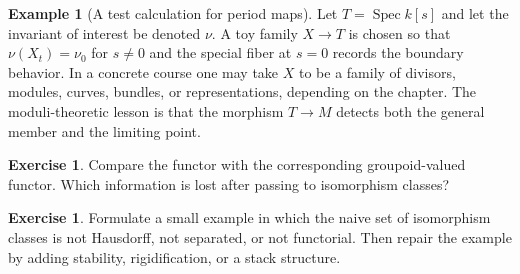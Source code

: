 \documentclass[11pt]{amsart}
\theoremstyle{definition}
\newtheorem{example}[theorem]{Example}
\newtheorem{exercise}[theorem]{Exercise}
\newcommand{\Spec}{\operatorname{Spec}}
\begin{document}
\begin{example}[A test calculation for period maps]
Let $T=\Spec k[s]$ and let the invariant of interest be denoted $\nu$.  A toy family $X\to T$ is chosen so that $\nu(X_t)=\nu_0$ for $s\ne0$ and the special fiber at $s=0$ records the boundary behavior.  In a concrete course one may take $X$ to be a family of divisors, modules, curves, bundles, or representations, depending on the chapter.  The moduli-theoretic lesson is that the morphism $T\to M$ detects both the general member and the limiting point.
\end{example}
\begin{exercise}
Compare the functor with the corresponding groupoid-valued functor.  Which information is lost after passing to isomorphism classes?
\end{exercise}
\begin{exercise}
Formulate a small example in which the naive set of isomorphism classes is not Hausdorff, not separated, or not functorial.  Then repair the example by adding stability, rigidification, or a stack structure.
\end{exercise}
\clearpage
\end{document}
